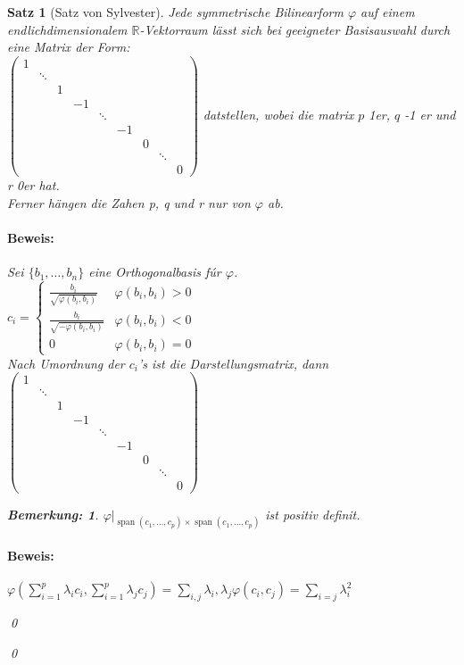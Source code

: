 \documentclass{report}
\newcommand{\lb}{\lambda}
\newcommand{\R}{\mathbb{R}}
\DeclareMathOperator{\Span}{span}
\theoremstyle{customrem}
\newtheorem*{bemerkung}{Bemerkung\textnormal:}
\theoremstyle{customdef}
\newtheorem{satz}[definition]{Satz}
\renewenvironment{proof}{\paragraph{Beweis: }}{\qed}
\theoremstyle{customenv}
\begin{document}
\begin{satz}[Satz von Sylvester]
  Jede symmetrische Bilinearform \(\varphi\) auf einem endlichdimensionalem
  \(\R\)-Vektorraum l\"asst sich bei geeigneter Basisauswahl durch eine Matrix
  der Form:\\
  \(\begin{pmatrix}
  1\\
  &\ddots\\
  &&1\\
  &&&-1\\
  &&&&\ddots\\
  &&&&&-1\\
  &&&&&&0\\
  &&&&&&&\ddots\\
  &&&&&&&&0
  \end{pmatrix}
  \) datstellen, wobei die matrix \(p\) 1er, \(q\) -1 er und r 0er hat.\\
  Ferner h\"angen die Zahen p, q und r nur von \(\varphi\) ab.
  \begin{proof}
    Sei \(\{b_1, \dots, b_n\}\) eine Orthogonalbasis f\'ur \(\varphi\).\\
    \(
    c_i = \begin{cases}
      \frac{b_i}{\sqrt{\varphi(b_i, b_i)}} & \varphi(b_i, b_i) > 0\\
      \frac{b_i}{\sqrt{-\varphi(b_i, b_i)}} & \varphi(b_i, b_i) < 0\\
      0 & \varphi(b_i, b_i) = 0
    \end{cases}
    \)\\
    Nach Umordnung der \(c_i\)'s ist die Darstellungsmatrix, dann  
    \(\begin{pmatrix}
      1\\
      &\ddots\\
      &&1\\
      &&&-1\\
      &&&&\ddots\\
      &&&&&-1\\
      &&&&&&0\\
      &&&&&&&\ddots\\
      &&&&&&&&0
    \end{pmatrix}
    \)\\
    \begin{bemerkung}
      \(\varphi |_{\Span(c_1, \dots, c_p) \times \Span(c_1, \dots, c_p)}\) ist
      positiv definit.
      \begin{proof}
        \(\varphi(\sum_{i=1}^p \lb_i c_i, \sum_{i=1}^p \lb_j c_j)
        = \sum_{i, j} \lb_i, \lb_j \varphi(c_i, c_j) = \sum_{i = j} \lb_i^2\)

\end{proof}
\end{bemerkung}
\end{proof}
\end{satz}
\end{document}
